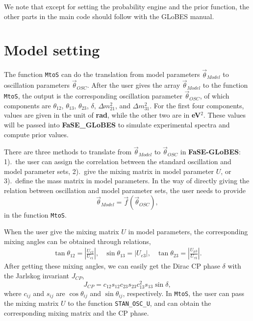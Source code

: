\documentclass[aps,prd,nofootinbib,preprint]{revtex4}
\begin{document}
We note that except for setting the probability engine and the prior function, the other parts in the main code should follow with the GLoBES manual. 


\section{Model setting}\label{sec:model_set}

The function \texttt{MtoS} can do the translation from model parameters $\vec{\theta}_{Model}$ to oscillation parameters $\vec{\theta}_{OSC}$. After the user gives the array $\vec{\theta}_{Model}$ to the function \texttt{MtoS}, the output is the corresponding oscillation parameter $\vec{\theta}_{OSC}$, of which components are $\theta_{12}$, $\theta_{13}$, $\theta_{23}$, $\delta$, $\Delta m_{21}^2$, and $\Delta m_{31}^2$. For the first four components, values are given in the unit of \textbf{rad}, while the other two are in \textbf{eV$^2$}. These values will be passed into \textbf{FaSE\_GLoBES} to simulate experimental spectra and compute prior values.

{\color{blue}There are three methods to translate from $\vec{\theta}_{Model}$ to $\vec{\theta}_{OSC}$ in \textbf{FaSE-GLoBES}:} 1).~the user can assign the correlation between the standard oscillation and model parameter sets{\color{blue}, 2).~give the mixing matrix in model parameter $U$}, or 3).~define the mass matrix in model parameters. 
In the way of directly giving the relation between oscillation and model parameter sets, the user needs to provide
{\color{blue}
\begin{equation}
\vec{\theta}_{Model}=\vec{f}(\vec{\theta}_{OSC}), 
\end{equation}
in the function \texttt{MtoS}. }
%

{\color{blue}When the user give the mixing matrix $U$ in model parameters, the corresponding mixing angles can be obtained through relations,
\begin{eqnarray}\label{eq:U_angle}
\tan\theta_{12}=\left|\frac{U_{e2}}{U_{e1}}\right|,&  \sin\theta_{13}=|U_{e3}|,& \tan\theta_{23} = \left|\frac{U_{\mu 3}}{U_{\tau 3}}\right|.
\end{eqnarray}
After getting these mixing angles, we can easily get the Dirac CP phase $\delta$ with the Jarlskog invariant $J_{CP}$,\
\begin{equation}\label{eq:U_phase}
J_{CP}=c_{12}s_{12}c_{23}s_{23}c_{13}^2s_{13}\sin\delta,
\end{equation}
where $c_{ij}$ and $s_{ij}$ are $\cos \theta_{ij}$ and $\sin\theta_{ij}$, respectively. In \texttt{MtoS}, the user can pass the mixing matrix $U$ to the function  \texttt{STAN\_OSC\_U}, and can obtain the corresponding mixing matrix and the CP phase. 
}
\end{document}
